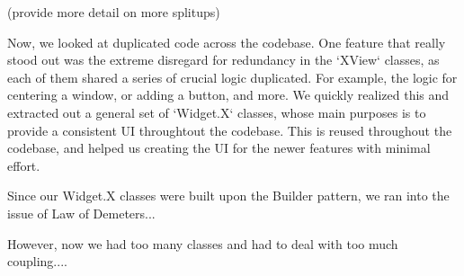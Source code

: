 (provide more detail on more splitups)

Now, we looked at duplicated code across the codebase. One feature that really stood out was the extreme disregard for redundancy in the `XView` classes, as each of them shared a series of crucial logic duplicated. For example, the logic for centering a window, or adding a button, and more. We quickly realized this and extracted out a general set of `Widget.X` classes, whose main purposes is to provide a consistent UI throughtout the codebase. This is reused throughout the codebase, and helped us creating the UI for the newer features with minimal effort.

Since our Widget.X classes were built upon the Builder pattern, we ran into the issue of Law of Demeters...

However, now we had too many classes and had to deal with too much coupling....

